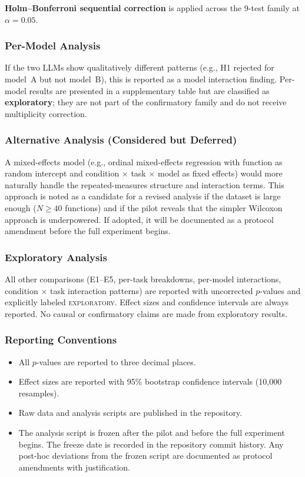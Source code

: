 \documentclass[11pt]{article}
\begin{document}
\textbf{Holm--Bonferroni sequential correction} is applied across
the 9-test family at $\alpha = 0.05$.

\subsubsection*{Per-Model Analysis}

If the two LLMs show qualitatively different patterns (e.g., H1
rejected for model~A but not model~B), this is reported as a
model interaction finding.  Per-model results are presented in a
supplementary table but are classified as \textbf{exploratory}; they
are not part of the confirmatory family and do not receive
multiplicity correction.

\subsubsection*{Alternative Analysis (Considered but Deferred)}

A mixed-effects model (e.g., ordinal mixed-effects regression with
function as random intercept and condition $\times$ task $\times$
model as fixed effects) would more naturally handle the
repeated-measures structure and interaction terms.  This approach is
noted as a candidate for a revised analysis if the dataset is large
enough ($N \geq 40$ functions) and if the pilot reveals that the
simpler Wilcoxon approach is underpowered.  If adopted, it will be
documented as a protocol amendment before the full experiment begins.

\subsubsection*{Exploratory Analysis}

All other comparisons (E1--E5, per-task breakdowns, per-model
interactions, condition $\times$ task interaction patterns) are
reported with uncorrected $p$-values and explicitly labeled
\textsc{exploratory}.  Effect sizes and confidence intervals are
always reported.  No causal or confirmatory claims are made from
exploratory results.

\subsubsection*{Reporting Conventions}

\begin{itemize}[nosep]
  \item All $p$-values are reported to three decimal places.
  \item Effect sizes are reported with 95\% bootstrap confidence
        intervals (10{,}000 resamples).
  \item Raw data and analysis scripts are published in the repository.
  \item The analysis script is frozen after the pilot and before the
        full experiment begins.  The freeze date is recorded in the
        repository commit history.  Any post-hoc deviations from the
        frozen script are documented as protocol amendments with
        justification.
\end{itemize}
\end{document}
